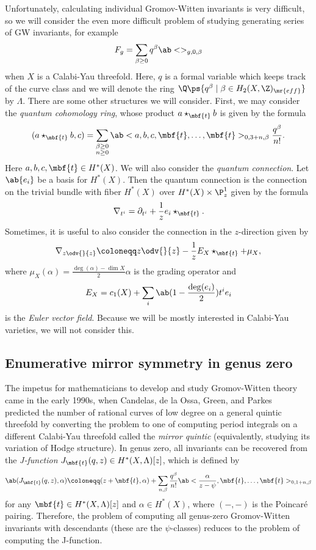 Unfortunately, calculating individual Gromov-Witten invariants is very difficult, so we will consider the even more difficult problem of studying generating series of GW invariants, for example
\[ F_g = \sum_{\beta \geq 0} q^{\beta} \ab<>_{g,0,\beta} \]
when \(X\) is a Calabi-Yau threefold. Here, \(q\) is a formal variable which keeps track of the curve class and we will denote the ring \(\Q\ps{q^{\beta} \mid \beta \in H_2(X, \Z)_{\mr{eff}}}\) by \(\Lambda\). There are some other structures we will consider. First, we may consider the \textit{quantum cohomology ring}, whose product \(a \star_{\mbf{t}} b\) is given by the formula 
\[
    (a \star_{\mbf{t}} b, c) = \sum_{\substack{\beta \geq 0 \\ n \geq 0}} \ab<a,b,c, \mbf{t}, \ldots, \mbf{t}>_{0,3+n,\beta} \frac{q^{\beta}}{n!}.
\]
Here \(a,b,c, \mbf{t} \in H^*(X)\). We will also consider the \textit{quantum connection}. Let \(\ab\{ e_i \}\) be a basis for \(H^*(X)\). Then the quantum connection is the connection on the trivial bundle with fiber \(H^*(X)\) over \(H^*(X) \times \P^1_z\) given by the formula
\[ \nabla_{t^i} = \partial_{t^i} + \frac{1}{z} e_i \star_{\mbf{t}}. \]
Sometimes, it is useful to also consider the connection in the \(z\)-direction given by 
\[ \nabla_{z \odv{}{z}} \coloneqq z \odv{}{z} - \frac{1}{z} E_X \star_{\mbf{t}} + \mu_X, \]
where \(\mu_X(\alpha) = \frac{\deg(\alpha) - \dim X}{2} \alpha\) is the grading operator and
\[ E_X = c_1(X) + \sum_i \ab(1 - \frac{\deg(e_i)}{2})t^i e_i \]
is the \textit{Euler vector field}. Because we will be mostly interested in Calabi-Yau varieties, we will not consider this.

\subsection{Enumerative mirror symmetry in genus zero}%
\label{sub:Enumerative mirror symmetry in genus zero}

The impetus for mathematicians to develop and study Gromov-Witten theory came in the early 1990s, when Candelas, de la Ossa, Green, and Parkes~\cite{CandelasEtAl1991} predicted the number of rational curves of low degree on a general quintic threefold by converting the problem to one of computing period integrals on a different Calabi-Yau threefold called the \textit{mirror quintic} (equivalently, studying its variation of Hodge structure). In genus zero, all invariants can be recovered from the \textit{J-function} \(J_{\mbf{t}}(q,z) \in H^*(X, \Lambda)[z]\), which is defined by
\[ \ab( J_{\mbf{t}}(q, z), \alpha ) \coloneqq (z + \mbf{t}, \alpha) + \sum_{n, \beta} \frac{q^{\beta}}{n!} \ab< \frac{\alpha}{z-\psi}, \mbf{t}, \ldots, \mbf{t}>_{0,1+n, \beta} \]
for any \(\mbf{t} \in H^*(X, \Lambda)[z]\) and \(\alpha \in H^*(X)\), where \((-,-)\) is the Poincar\'e pairing. Therefore, the problem of computing all genus-zero Gromov-Witten invariants with descendants (these are the \(\psi\)-classes) reduces to the problem of computing the J-function.

